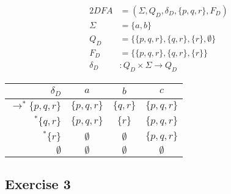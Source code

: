 {\begin{center}
\end{center}
\begin{center}
\begin{minipage}[c]{0.35\textwidth}
\begin{alignat*}{2}
	DFA       &= (\Sigma, Q_D, \delta_D, \{p,q,r\}, F_D)\\
	\Sigma    &= \{a,b\}\\
	Q_D       &= \{\{p,q,r\},\{q,r\},\{r\},\emptyset\}\\
	F_D       &= \{\{p,q,r\},\{q,r\},\{r\}\}\\
	\delta_D &\colon Q_D \times \Sigma \rightarrow Q_D
\end{alignat*}
\end{minipage}%
\begin{minipage}[c]{0.45\textwidth}
\begin{center}
\begin{tabular}{ r | c c c }
    $\delta_D$ & $a$ & $b$ & $c$ \\ \hline
    $\rightarrow^* \{p,q,r\}$ & $\{p,q,r\}$ & $\{  q,r\}$ & $\{p,q,r\}$ \\
    $           ^* \{  q,r\}$ & $\{p,q,r\}$ & $\{    r\}$ & $\{p,q,r\}$ \\
    $           ^* \{    r\}$ & $\emptyset$ & $\emptyset$ & $\{p,q,r\}$\\
    $ \emptyset                $ & $\emptyset$ & $\emptyset$ & $\emptyset$
\end{tabular}
\end{center}
\end{minipage}
\end{center}
\subsection{Exercise 3}
}
